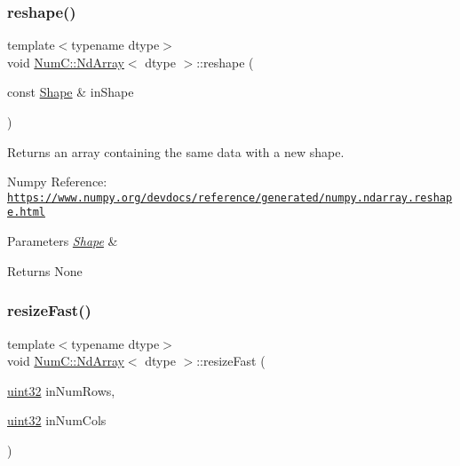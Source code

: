 \subsubsection{\texorpdfstring{reshape()}{reshape()}\hspace{0.1cm}{\footnotesize\ttfamily [2/2]}}
{\footnotesize\ttfamily template$<$typename dtype$>$ \\
void \mbox{\hyperlink{class_num_c_1_1_nd_array}{Num\+C\+::\+Nd\+Array}}$<$ dtype $>$\+::reshape (\begin{DoxyParamCaption}\item[{const \mbox{\hyperlink{class_num_c_1_1_shape}{Shape}} \&}]{in\+Shape }\end{DoxyParamCaption})\hspace{0.3cm}{\ttfamily [inline]}}

Returns an array containing the same data with a new shape.

Numpy Reference\+: \href{https://www.numpy.org/devdocs/reference/generated/numpy.ndarray.reshape.html}{\tt https\+://www.\+numpy.\+org/devdocs/reference/generated/numpy.\+ndarray.\+reshape.\+html}


\begin{DoxyParams}{Parameters}
{\em \mbox{\hyperlink{class_num_c_1_1_shape}{Shape}}} & \\
\hline
\end{DoxyParams}
\begin{DoxyReturn}{Returns}
None 
\end{DoxyReturn}
\mbox{\label{class_num_c_1_1_nd_array_a6a46a3ea9c292d315d6dc2e6381d2e0f}} 
\subsubsection{\texorpdfstring{resize\+Fast()}{resizeFast()}\hspace{0.1cm}{\footnotesize\ttfamily [1/2]}}
{\footnotesize\ttfamily template$<$typename dtype$>$ \\
void \mbox{\hyperlink{class_num_c_1_1_nd_array}{Num\+C\+::\+Nd\+Array}}$<$ dtype $>$\+::resize\+Fast (\begin{DoxyParamCaption}\item[{\mbox{\hyperlink{namespace_num_c_ae685802ca6d3035f2b400b081e3953fa}{uint32}}}]{in\+Num\+Rows,  }\item[{\mbox{\hyperlink{namespace_num_c_ae685802ca6d3035f2b400b081e3953fa}{uint32}}}]{in\+Num\+Cols }\end{DoxyParamCaption})\hspace{0.3cm}{\ttfamily [inline]}}

